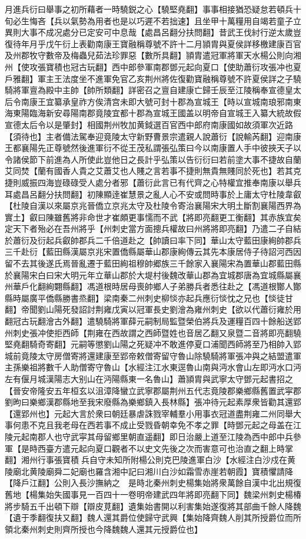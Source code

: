 月進兵衍曰舉事之初所藉者一時驍鋭之心【驍堅堯翻】事事相接猶恐疑怠若頓兵十旬必生悔吝【兵以氣勢為用者也是以巧遲不若拙速】且坐甲十萬糧用自竭若童子立異則大事不成况處分已定安可中息哉【處昌呂翻分扶問翻】昔武王伐紂行逆太歲豈復待年月乎戊午衍上表勸南康王寶融稱尊號不許十二月頴胄與夏侯詳移檄建康百官及州郡牧守數帝及梅蟲兒茹法珍罪惡【數所具翻】頴胄遣冠軍將軍天水楊公則向湘州【使攻張寶積也冠古玩翻】西中郎參軍南郡鄧元起向夏口【使助蕭衍攻張冲也夏戶雅翻】軍主王法度坐不進軍免官乙亥荆州將佐復勸寶融稱尊號不許夏侯詳之子驍騎將軍亶為殿中主帥【帥所類翻】詳密召之亶自建康亡歸壬辰至江陵稱奉宣德皇太后令南康王宜纂承皇祚方俟清宫未即大號可封十郡為宣城王【時以宣城南琅邪南東海東陽臨海新安尋陽南郡竟陵宜都十郡為宣城王國盖以明帝自宣城王入纂大統故假宣德太后令以是肇封】相國荆州牧加黄鉞選百官西中郎府南康國如故須軍次近路【須待也】主者備法駕奉迎竟陵太守新野曹景宗遣親人說蕭衍【說輸芮翻】迎南康王都襄陽先正尊號然後進軍衍不從王茂私謂張弘策曰今以南康置人手中彼挾天子以令諸侯節下前進為人所使此豈他日之長計乎弘策以告衍衍曰若前塗大事不捷故自蘭艾同焚【蘭有國香人貴之艾蕭艾也人賤之言若事不捷則無貴無賤同於死也】若其克捷則威振四海豈碌碌受人處分者邪【蕭衍此言已有代齊之心特權宜推奉南康以舉兵耳處昌呂翻分扶問翻】初陳顯逹崔慧景之亂人心不安或問時事於上庸太守杜陵韋叡【杜陵自漢以來屬京兆晉僑立京兆太守及杜陵令寄治襄陽宋大明土斷割襄陽西界為實土】叡曰陳雖舊將非命世才崔頗更事懦而不武【將即亮翻更工衡翻】其赤族宜矣定天下者殆必在吾州將乎【州刺史當方面摠兵權故曰州將將即亮翻】乃遣二子自結於蕭衍及衍起兵叡帥郡兵二千倍道赴之【帥讀曰率下同】華山太守藍田康絢帥郡兵三千赴衍【藍田縣漢屬京兆宋置僑縣屬華山郡康絢傳云其先本康居侍子待詔河西因留不去其後遂氏焉晉亂遷于藍田絢祖穆帥郷族三千餘家入襄陽宋為置華山郡藍田縣於襄陽宋白曰宋大明元年立華山郡於大堤村後魏改華山郡為宜城郡唐為宜城縣屬襄州華戶化翻絢翾縣翻】馮道根時居母喪帥鄉人子弟勝兵者悉往赴之【馮道根酇人酇縣時屬廣平僑縣勝書烝翻】梁南秦二州刺史柳惔亦起兵應衍惔忱之兄也【惔徒甘翻】帝聞劉山陽死發詔討荆雍戊寅以冠軍長史劉澮為雍州刺史【欲以代蕭衍雍於用翻冠古玩翻澮古外翻】遣驍騎將軍薛元嗣制局監暨榮伯將兵及運糧百四十餘船送郢州刺史張冲使拒西師【荆雍在西故謂之西師暨姓也音居乙翻又泉暨二音將即亮翻驍堅堯翻騎奇寄翻】元嗣等懲劉山陽之死疑冲不敢進停夏口浦聞西師將至乃相帥入郢城前竟陵太守房僧寄將還建康至郢帝敕僧寄留守魯山除驍騎將軍張冲與之結盟遣軍主孫樂祖將數千人助僧寄守魯山【水經注江水東逕魯山南與沔水會山左即沔水口沔左有偃月城漢陽志大别山在沔陽縣東一名魯山】蕭頴胄與武寧太守鄧元起書招之【晉安帝隆安五年桓玄以沮漳降蠻立武寧郡屬荆州五代志竟陵郡樂鄉縣舊置武寜郡劉昫曰樂鄉漢郡縣地至我宋廢縣為樂鄉鎮入長林縣】張冲待元起素厚衆皆勸其還郢【還郢州也】元起大言於衆曰朝廷暴虐誅戮宰輔羣小用事衣冠道盡荆雍二州同舉大事何患不克且我老母在西若事不成止受戮昏朝幸免不孝之罪【時鄧元起之母盖在江陵元起南郡人也守武寜其母留鄉里朝直遥翻】即日治嚴上道至江陵為西中郎中兵參軍【是時西臺方遣元起向夏口觀者不以史文先後之次而害意可也治直之翻上時掌翻】湘州行事張寶積兵自守未知所附楊公則克巴陵進軍白沙【水經注白沙戍在黄陵廟北黄陵廟舜二妃廟也羅含湘中記曰湘川白沙如霜雪赤崖若朝霞】寶積懼請降【降戶江翻】公則入長沙撫納之　是時北秦州刺史楊集始將衆萬餘自漢中北出規復舊地【楊集始失國事見一百四十一卷明帝建武四年將即亮翻下同】魏梁州刺史楊椿將步騎五千出頓下辯【辯皮莧翻】遺集始書開以利害集始遂復將其部曲千餘人降魏【遺于季翻復扶又翻】魏人還其爵位使歸守武興【集始降齊魏人削其所授爵位而所領北秦州刺史則齊所授也今降魏魏人還其元授爵位也】

